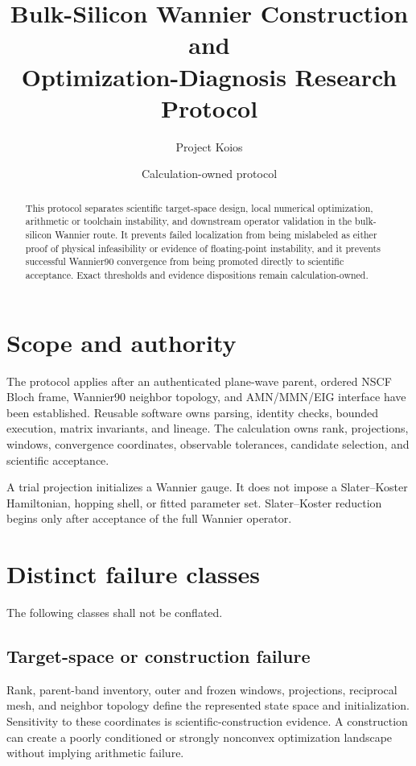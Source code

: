 \documentclass[11pt]{article}
\title{Bulk-Silicon Wannier Construction and\\Optimization-Diagnosis Research Protocol}
\author{Project Koios}
\date{Calculation-owned protocol}
\begin{document}
\maketitle

\begin{abstract}
This protocol separates scientific target-space design, local numerical optimization,
arithmetic or toolchain instability, and downstream operator validation in the
bulk-silicon Wannier route.  It prevents failed localization from being mislabeled as
either proof of physical infeasibility or evidence of floating-point instability, and
it prevents successful Wannier90 convergence from being promoted directly to scientific
acceptance.  Exact thresholds and evidence dispositions remain calculation-owned.
\end{abstract}

\section{Scope and authority}

The protocol applies after an authenticated plane-wave parent, ordered NSCF Bloch frame,
Wannier90 neighbor topology, and AMN/MMN/EIG interface have been established.  Reusable
software owns parsing, identity checks, bounded execution, matrix invariants, and lineage.
The calculation owns rank, projections, windows, convergence coordinates, observable
tolerances, candidate selection, and scientific acceptance.

A trial projection initializes a Wannier gauge.  It does not impose a Slater--Koster
Hamiltonian, hopping shell, or fitted parameter set.  Slater--Koster reduction begins
only after acceptance of the full Wannier operator.

\section{Distinct failure classes}

The following classes shall not be conflated.

\subsection{Target-space or construction failure}

Rank, parent-band inventory, outer and frozen windows, projections, reciprocal mesh, and
neighbor topology define the represented state space and initialization.  Sensitivity to
these coordinates is scientific-construction evidence.  A construction can create a
poorly conditioned or strongly nonconvex optimization landscape without implying
arithmetic failure.
\end{document}
